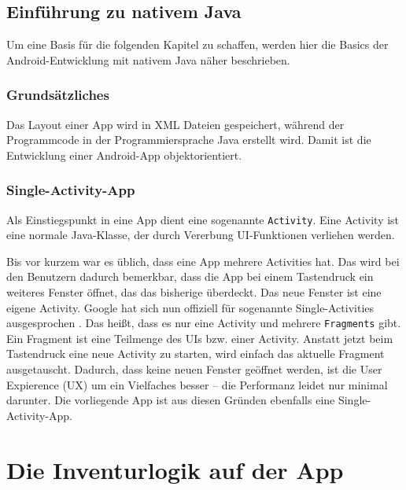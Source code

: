 \hypertarget{einfuxfchrung-zu-nativem-java}{%
\section{Einführung zu nativem
Java}\label{einfuxfchrung-zu-nativem-java}}

Um eine Basis für die folgenden Kapitel zu schaffen, werden hier die
Basics der Android-Entwicklung mit nativem Java näher beschrieben.

\hypertarget{grundsuxe4tzliches}{%
\subsection{Grundsätzliches}\label{grundsuxe4tzliches}}

Das Layout einer App wird in XML Dateien gespeichert, während der
Programmcode in der Programmiersprache Java erstellt wird. Damit ist die
Entwicklung einer Android-App objektorientiert.

\hypertarget{single-activity-app}{%
\subsection{Single-Activity-App}\label{single-activity-app}}

Als Einstiegspunkt in eine App dient eine sogenannte \texttt{Activity}.
Eine Activity ist eine normale Java-Klasse, der durch Vererbung
UI-Funktionen verliehen werden.

Bis vor kurzem war es üblich, dass eine App mehrere Activities hat. Das
wird bei den Benutzern dadurch bemerkbar, dass die App \zB bei einem
Tastendruck ein weiteres Fenster öffnet, das das bisherige überdeckt.
Das neue Fenster ist eine eigene Activity. Google hat sich nun offiziell
für sogenannte Single-Activities ausgesprochen \cite{single-activity}.
Das heißt, dass es nur eine Activity und mehrere \texttt{Fragments}
gibt. Ein Fragment ist eine Teilmenge des UIs bzw. einer Activity.
Anstatt jetzt beim Tastendruck eine neue Activity zu starten, wird
einfach das aktuelle Fragment ausgetauscht. Dadurch, dass keine neuen
Fenster geöffnet werden, ist die User Expierence (UX) um ein Vielfaches
besser -- die Performanz leidet nur minimal darunter. Die vorliegende
App ist aus diesen Gründen ebenfalls eine Single-Activity-App.

\chapter{Die Inventurlogik auf der App}

